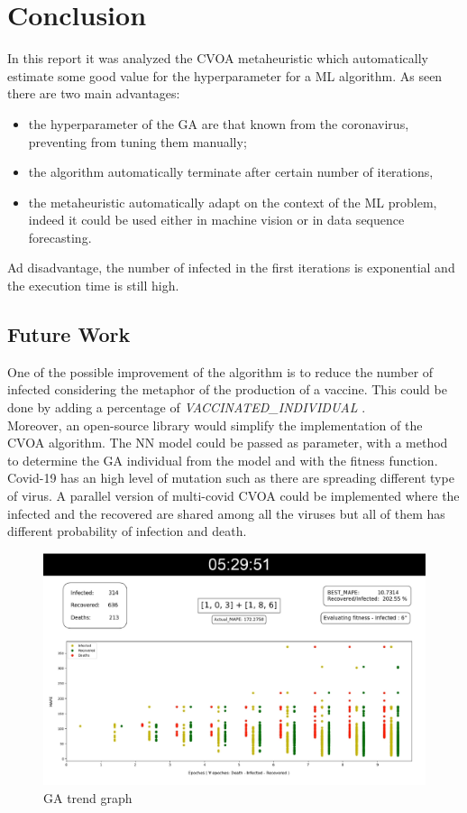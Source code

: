 \documentclass[letterpaper]{article}%
\begin{document}
\section{Conclusion}
In this report it was analyzed the CVOA metaheuristic which automatically estimate some good value for the hyperparameter for a ML algorithm. As seen there are two main advantages:
\begin{itemize}
	\item the hyperparameter of the GA are that known from the coronavirus, preventing from tuning them manually;
	\item the algorithm automatically terminate after certain number of iterations,
	\item the metaheuristic automatically adapt on the context of the ML problem, indeed it could be used either in machine vision or in data sequence forecasting.
\end{itemize}
Ad disadvantage, the number of infected in the first iterations is exponential and the execution time is still high.

\subsection{Future Work}
One of the possible improvement of the algorithm is to reduce the number of infected considering the metaphor of the production of a vaccine. This could be done by adding a percentage of  \textit{VACCINATED\_INDIVIDUAL} .\\
Moreover, an open-source library would simplify the implementation of the CVOA algorithm. The NN model could be passed as parameter, with a method to determine the GA individual from the model and with the fitness function.\\
Covid-19 has an high level of mutation such as there are spreading different type of virus. A parallel version of multi-covid CVOA could be implemented where the infected and the recovered are shared among all the viruses but all of them has different probability of infection and death. 
\clearpage 
\onecolumn
\begin{figure}[!h]
	\includegraphics[width=\columnwidth]{img/GA_algorithm_iter10-resize}
	\caption{GA trend graph}
	\label{fig:GAgraph}
\end{figure}
\end{document}
